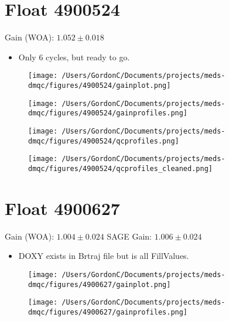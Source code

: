 \section{Float 4900524}

Gain (WOA): $1.052 \pm 0.018$

\begin{itemize}
	\item Only 6 cycles, but ready to go.
\end{itemize}


\begin{figure}[H]
	\centering
	\texttt{[image: /Users/GordonC/Documents/projects/meds-dmqc/figures/4900524/gainplot.png]}
	\caption{}
\end{figure}


\begin{figure}[H]
	\centering
	\texttt{[image: /Users/GordonC/Documents/projects/meds-dmqc/figures/4900524/gainprofiles.png]}
	\caption{}
\end{figure}


\begin{figure}[H]
	\centering
	\texttt{[image: /Users/GordonC/Documents/projects/meds-dmqc/figures/4900524/qcprofiles.png]}
	\caption{}
\end{figure}


\begin{figure}[H]
	\centering
	\texttt{[image: /Users/GordonC/Documents/projects/meds-dmqc/figures/4900524/qcprofiles\_cleaned.png]}
	\caption{}
\end{figure}

\section{Float 4900627}

Gain (WOA): $1.004 \pm 0.024$
SAGE Gain: $1.006 \pm 0.024$

\begin{itemize}
	\item DOXY exists in Brtraj file but is all FillValues.
\end{itemize}


\begin{figure}[H]
	\centering
	\texttt{[image: /Users/GordonC/Documents/projects/meds-dmqc/figures/4900627/gainplot.png]}
	\caption{}
\end{figure}


\begin{figure}[H]
	\centering
	\texttt{[image: /Users/GordonC/Documents/projects/meds-dmqc/figures/4900627/gainprofiles.png]}
	\caption{}
\end{figure}


